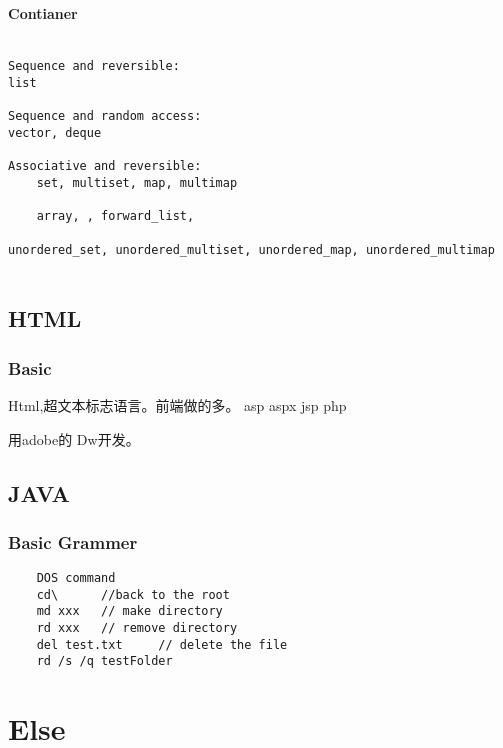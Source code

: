 \documentclass[UTF8]{../computerUniverse}
\begin{document}
\subsubsection{Contianer}
\begin{lstlisting}

Sequence and reversible:
list 

Sequence and random access:
vector, deque

Associative and reversible:
    set, multiset, map, multimap  

    array, , forward_list,  

unordered_set, unordered_multiset, unordered_map, unordered_multimap  


\end{lstlisting}




\section{HTML}

\subsection{Basic}
Html,超文本标志语言。前端做的多。
asp
aspx
jsp
php

用adobe的 Dw开发。


\section{JAVA}

\subsection{Basic Grammer}
\begin{lstlisting}
    DOS command
    cd\      //back to the root
    md xxx   // make directory
    rd xxx   // remove directory
    del test.txt     // delete the file
    rd /s /q testFolder
 \end{lstlisting}


\chapter{Else}
\end{document}
